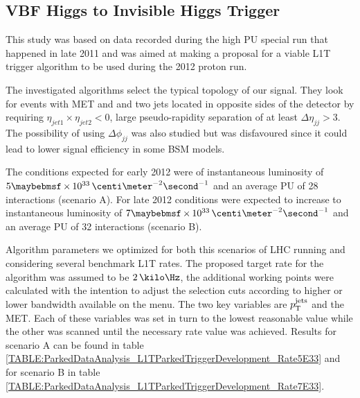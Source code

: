 \subsection{VBF Higgs to Invisible Higgs Trigger}
\label{SUBSECTION:ParkedDataAnalysis_ParkedTriggerDevelopment_VBFHiggsInvisibleTrigger}


This study was based on data recorded during the high \gls{PU} special run that happened in late 2011 and was aimed at making a proposal for a viable \gls{L1T} trigger algorithm to be used during the 2012 proton run. 

The investigated algorithms select the typical topology of our signal. They look for events with \gls{MET} and and two jets located in opposite sides of the detector by requiring $\eta_{jet1}\times\eta_{jet2}<0$, large pseudo-rapidity separation of at least $\Delta\eta_{jj}>3$. The possibility of using $\Delta\phi_{jj}$ was also studied but was disfavoured since it could lead to lower signal efficiency in some \gls{BSM} models.

The conditions expected for early 2012 were of instantaneous luminosity of $5 \times 10^{33}\,\centi\meter^{-2}\second^{-1}$ and an average \gls{PU} of 28 interactions (scenario A). For late 2012 conditions were expected to increase to instantaneous luminosity of $7 \times 10^{33}\,\centi\meter^{-2}\second^{-1}$ and an average \gls{PU} of 32 interactions (scenario B).

Algorithm parameters we optimized for both this scenarios of \gls{LHC} running and considering several benchmark \gls{L1T} rates. The proposed target rate for the algorithm was assumed to be $2\,\kilo\Hz$, the additional working points were calculated with the intention to adjust the selection cuts according to higher or lower bandwidth available on the menu. The two key variables are $p_{\mathrm{T}}^{\text{jets}}$ and the \gls{MET}. Each of these variables was set in turn to the lowest reasonable value while the other was scanned until the necessary rate value was achieved.  Results for scenario A can be found in table \ref{TABLE:ParkedDataAnalysis_L1TParkedTriggerDevelopment_Rate5E33} and for scenario B in table \ref{TABLE:ParkedDataAnalysis_L1TParkedTriggerDevelopment_Rate7E33}.

